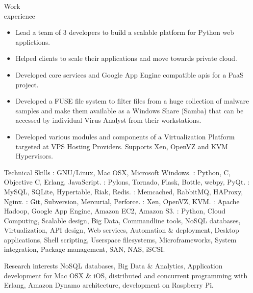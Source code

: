 \documentclass{resume}
\begin{document}
\begin{category}{Work \\experience}
\begin{itemize}
  \item Lead a team of 3 developers to build a scalable platform for Python web applictions.
  \item Helped clients to scale their applications and move towards private cloud.
  \item Developed core services and Google App Engine compatible apis for a PaaS project.
  \item Developed a FUSE file system to filter files from a huge collection of malware samples 
  and make them available as a Windows Share (Samba) that can be accessed by individual 
  Virus Analyst from their workstations.
  \item Developed various modules and components of a Virtualization Platform targeted at VPS Hosting
  Providers. Supports Xen, OpenVZ and KVM Hypervisors.
  \end{itemize}
\end{category}

\begin{category}{Technical Skills}
  : GNU/Linux, Mac OSX, Microsoft Windows.
  : Python, C, Objective
  C, Erlang, JavaScript.
  : Pylons, Tornado, Flask, Bottle, webpy, PyQt.
  : MySQL, SQLite, Hypertable, Riak, Redis.
  : Memcached, RabbitMQ, HAProxy, Nginx.
  : Git, Subversion, Mercurial,
  Perforce.
  : Xen, OpenVZ, KVM.
  : Apache Hadoop, Google App Engine, Amazon EC2, Amazon S3.
  : Python, Cloud Computing, Scalable design, Big Data, Commandline 
  tools, NoSQL databases, Virtualization, API design, Web services, Automation \& deployment, 
  Desktop applications, Shell scripting, Userspace filesystems, Microframeworks, System integration, 
  Package management, SAN, NAS, iSCSI.
\end{category}


\begin{category}{Research interests}
  \citemnobullet NoSQL databases, Big Data \& Analytics, Application development for Mac OSX \& iOS,
  distributed and concurrent programming with Erlang, Amazon Dynamo architecture, development on Raspberry Pi.
\end{category}
\end{document}
